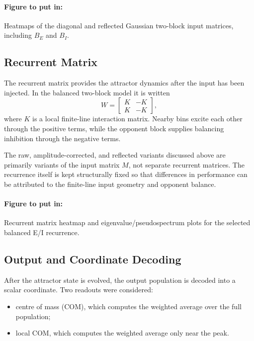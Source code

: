 \paragraph{Figure to put in:} Heatmaps of the diagonal and reflected Gaussian two-block input matrices, including $B_E$ and $B_I$.

\subsection{Recurrent Matrix}

The recurrent matrix provides the attractor dynamics after the input has been injected. In the balanced two-block model it is written
\begin{equation}
    W
    =
    \begin{bmatrix}
        K & -K\\
        K & -K
    \end{bmatrix},
\end{equation}
where $K$ is a local finite-line interaction matrix. Nearby bins excite each other through the positive terms, while the opponent block supplies balancing inhibition through the negative terms.

The raw, amplitude-corrected, and reflected variants discussed above are primarily variants of the input matrix $M$, not separate recurrent matrices. The recurrence itself is kept structurally fixed so that differences in performance can be attributed to the finite-line input geometry and opponent balance.

\paragraph{Figure to put in:} Recurrent matrix heatmap and eigenvalue/pseudospectrum plots for the selected balanced E/I recurrence.

\subsection{Output and Coordinate Decoding}

After the attractor state is evolved, the output population is decoded into a scalar coordinate. Two readouts were considered:
\begin{itemize}
    \item centre of mass (COM), which computes the weighted average over the full population;
    \item local COM, which computes the weighted average only near the peak.
\end{itemize}


